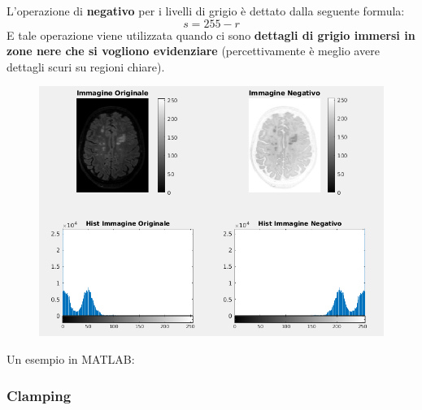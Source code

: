 \documentclass[a4paper]{article}
\begin{document}
	L'operazione di \textcolor{Red3}{\textbf{\textbf{negativo}}} per i livelli di grigio è dettato dalla seguente formula:
	\begin{equation*}
		s = 255 - r
	\end{equation*}
	E tale operazione viene utilizzata quando ci sono \textbf{dettagli di grigio immersi in zone nere che si vogliono evidenziare} (percettivamente è meglio avere dettagli scuri su regioni chiare).
	\begin{figure}[!htp]
		\centering
		\includegraphics[width=\textwidth]{img/lab/negativo.png}
	\end{figure}
	
	\noindent
	Un esempio in MATLAB:
	\newpage
	
	\subsubsection{Clamping}
	
\end{document}
